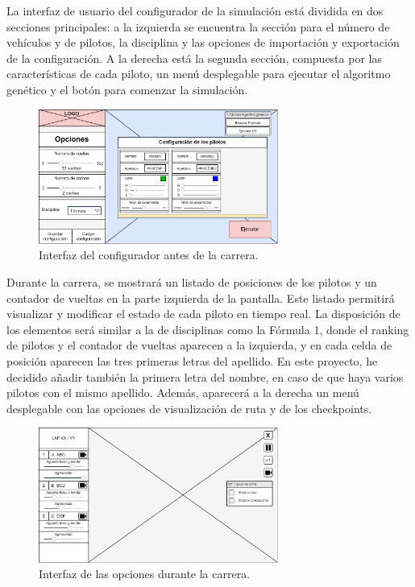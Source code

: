 \bigskip

La interfaz de usuario del configurador de la simulación
está dividida en dos secciones principales: a la izquierda se encuentra la sección para el número de vehículos y de pilotos, la disciplina y las opciones de importación y exportación de la configuración. A la derecha está la segunda sección, compuesta por las características de cada piloto, un menú desplegable para ejecutar el algoritmo genético y el botón para comenzar la simulación.

\begin{figure}[H]
    \centering
    \includegraphics[width=0.7\textwidth]{imagenes/pag1.png}
    \caption{Interfaz del configurador antes de la carrera.}
\end{figure}

Durante la carrera, se mostrará un listado de posiciones de los pilotos y un contador de vueltas 
en la parte izquierda de la pantalla. Este listado permitirá visualizar y modificar el estado de cada piloto en tiempo real. La disposición de los elementos será similar a la de disciplinas como la Fórmula 1, donde el ranking de pilotos y el contador de vueltas aparecen a la izquierda, y en cada celda de posición aparecen las tres primeras letras del apellido. En este proyecto, he decidido añadir también la primera letra del nombre, en caso de que haya varios pilotos con el mismo apellido. Además, aparecerá a la derecha un menú desplegable con las opciones de visualización de ruta y de los checkpoints.


\begin{figure}[H]
    \centering
    \includegraphics[width=0.7\textwidth]{imagenes/pag2.png}
    \caption{Interfaz de las opciones durante la carrera.}
    \label{fig:boc-ui-race}
\end{figure}


